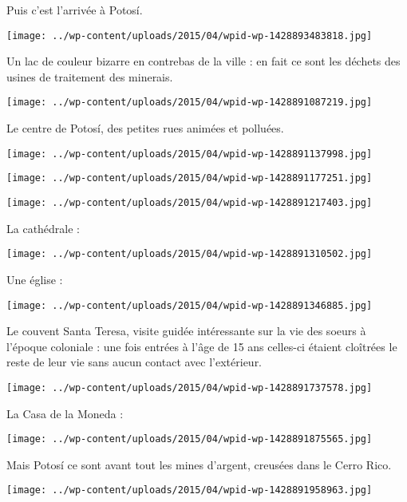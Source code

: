  Puis c'est l'arrivée à Potosí.
\begin{center} \texttt{[image: ../wp-content/uploads/2015/04/wpid-wp-1428893483818.jpg]} \end{center}

\pagebreak
 Un lac de couleur bizarre en contrebas de la ville : en fait ce sont les déchets des usines de traitement des minerais.
\begin{center} \texttt{[image: ../wp-content/uploads/2015/04/wpid-wp-1428891087219.jpg]} \end{center}

 Le centre de Potosí, des petites rues animées et polluées. 
\begin{center} \texttt{[image: ../wp-content/uploads/2015/04/wpid-wp-1428891137998.jpg]} \end{center}
\begin{center} \texttt{[image: ../wp-content/uploads/2015/04/wpid-wp-1428891177251.jpg]} \end{center}
\begin{center} \texttt{[image: ../wp-content/uploads/2015/04/wpid-wp-1428891217403.jpg]} \end{center}

\pagebreak
  La cathédrale :
\begin{center} \texttt{[image: ../wp-content/uploads/2015/04/wpid-wp-1428891310502.jpg]} \end{center}

  Une église :
\begin{center} \texttt{[image: ../wp-content/uploads/2015/04/wpid-wp-1428891346885.jpg]} \end{center}

 Le couvent Santa Teresa, visite guidée intéressante sur la vie des soeurs à l'époque coloniale : une fois entrées à l'âge de 15 ans celles-ci étaient cloîtrées le reste de leur vie sans aucun contact avec l'extérieur. 
\begin{center} \texttt{[image: ../wp-content/uploads/2015/04/wpid-wp-1428891737578.jpg]} \end{center}

 La Casa de la Moneda :
\begin{center} \texttt{[image: ../wp-content/uploads/2015/04/wpid-wp-1428891875565.jpg]} \end{center}

 Mais Potosí ce sont avant tout les mines d'argent, creusées dans le Cerro Rico.
\begin{center} \texttt{[image: ../wp-content/uploads/2015/04/wpid-wp-1428891958963.jpg]} \end{center}


